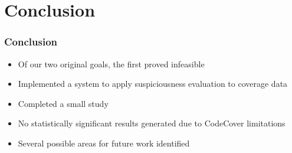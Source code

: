 \documentclass{beamer}
\begin{document}
	\section{Conclusion}
	\begin{frame}
		\frametitle{Conclusion}
		\begin{itemize}
	    	\item Of our two original goals, the first proved infeasible
	    	\pause
	    	\item Implemented a system to apply suspiciousness evaluation to coverage data
	    	\pause
	    	\item Completed a small study
	    	\pause
	    	\item No statistically significant results generated due to CodeCover limitations
			\pause
			\item Several possible areas for future work identified
		\end{itemize}
	\end{frame}
\end{document}
